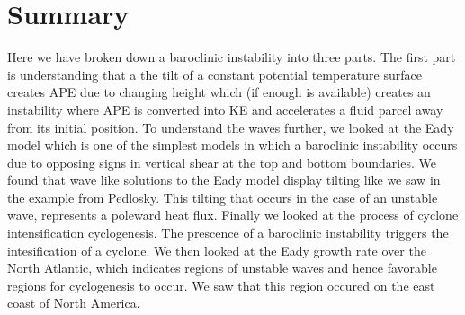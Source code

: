 \documentclass[a4paper,12pt]{article}
\begin{document}
\section{Summary}
Here we have broken down a baroclinic instability into three parts. The first part is understanding that a the tilt of a constant potential temperature surface creates APE due to changing height which (if enough is available) creates an instability where APE is converted into KE and accelerates a fluid parcel away from its initial position. To understand the waves further, we looked at the Eady model which is one of the simplest models in which a baroclinic instability occurs due to opposing signs in vertical shear at the top and bottom boundaries. We found that wave like solutions to the Eady model display tilting like we saw in the example from Pedlosky. This tilting that occurs in the case of an unstable wave, represents a poleward heat flux. Finally we looked at the process of cyclone intensification cyclogenesis. The prescence of a baroclinic instability triggers the intesification of a cyclone. We then looked at the Eady growth rate over the North Atlantic, which indicates regions of unstable waves and hence favorable regions for cyclogenesis to occur. We saw that this region occured on the east coast of North America. 
%
%
\printbibliography
\end{document}
